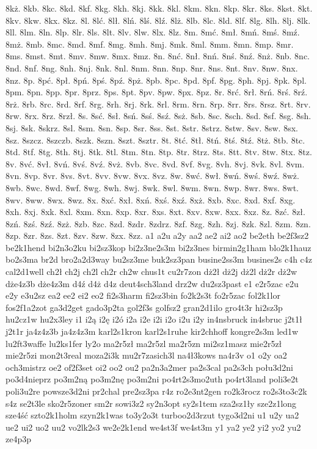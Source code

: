 {8kż.
8kb.
8kc.
8kd.
8kf.
8kg.
8kh.
8kj.
8kk.
8kl.
8km.
8kn.
8kp.
8kr.
8ks.
8kst.
8kt.
8kv.
8kw.
8kx.
8kz.
8l.
8lć.
8lł.
8lń.
8lś.
8lź.
8lż.
8lb.
8lc.
8ld.
8lf.
8lg.
8lh.
8lj.
8lk.
8ll.
8lm.
8ln.
8lp.
8lr.
8ls.
8lt.
8lv.
8lw.
8lx.
8lz.
8m.
8mć.
8mł.
8mń.
8mś.
8mź.
8mż.
8mb.
8mc.
8md.
8mf.
8mg.
8mh.
8mj.
8mk.
8ml.
8mm.
8mn.
8mp.
8mr.
8ms.
8mst.
8mt.
8mv.
8mw.
8mx.
8mz.
8n.
8nć.
8nł.
8nń.
8nś.
8nź.
8nż.
8nb.
8nc.
8nd.
8nf.
8ng.
8nh.
8nj.
8nk.
8nl.
8nm.
8nn.
8np.
8nr.
8ns.
8nt.
8nv.
8nw.
8nx.
8nz.
8p.
8pć.
8pł.
8pń.
8pś.
8pź.
8pż.
8pb.
8pc.
8pd.
8pf.
8pg.
8ph.
8pj.
8pk.
8pl.
8pm.
8pn.
8pp.
8pr.
8prz.
8ps.
8pt.
8pv.
8pw.
8px.
8pz.
8r.
8rć.
8rł.
8rń.
8rś.
8rź.
8rż.
8rb.
8rc.
8rd.
8rf.
8rg.
8rh.
8rj.
8rk.
8rl.
8rm.
8rn.
8rp.
8rr.
8rs.
8rsz.
8rt.
8rv.
8rw.
8rx.
8rz.
8rzł.
8s.
8sć.
8sł.
8sń.
8sś.
8sź.
8sż.
8sb.
8sc.
8sch.
8sd.
8sf.
8sg.
8sh.
8sj.
8sk.
8skrz.
8sl.
8sm.
8sn.
8sp.
8sr.
8ss.
8st.
8str.
8strz.
8stw.
8sv.
8sw.
8sx.
8sz.
8szcz.
8szczb.
8szk.
8szn.
8szt.
8sztr.
8t.
8tć.
8tł.
8tń.
8tś.
8tź.
8tż.
8tb.
8tc.
8td.
8tf.
8tg.
8th.
8tj.
8tk.
8tl.
8tm.
8tn.
8tp.
8tr.
8trz.
8ts.
8tt.
8tv.
8tw.
8tx.
8tz.
8v.
8vć.
8vł.
8vń.
8vś.
8vź.
8vż.
8vb.
8vc.
8vd.
8vf.
8vg.
8vh.
8vj.
8vk.
8vl.
8vm.
8vn.
8vp.
8vr.
8vs.
8vt.
8vv.
8vw.
8vx.
8vz.
8w.
8wć.
8wł.
8wń.
8wś.
8wź.
8wż.
8wb.
8wc.
8wd.
8wf.
8wg.
8wh.
8wj.
8wk.
8wl.
8wm.
8wn.
8wp.
8wr.
8ws.
8wt.
8wv.
8ww.
8wx.
8wz.
8x.
8xć.
8xł.
8xń.
8xś.
8xź.
8xż.
8xb.
8xc.
8xd.
8xf.
8xg.
8xh.
8xj.
8xk.
8xl.
8xm.
8xn.
8xp.
8xr.
8xs.
8xt.
8xv.
8xw.
8xx.
8xz.
8z.
8zć.
8zł.
8zń.
8zś.
8zź.
8zż.
8zb.
8zc.
8zd.
8zdr.
8zdrz.
8zf.
8zg.
8zh.
8zj.
8zk.
8zl.
8zm.
8zn.
8zp.
8zr.
8zs.
8zt.
8zv.
8zw.
8zx.
8zz.
a1
a2u
a2y
aa2
ae2
ai2
ao2
be2eth
be2f3sz2
be2k1hend
bi2n3o2ku
bi2sz3kop
bi2z3ne2s3m
bi2z3nes
birmin2g1ham
blo2k1hauz
bo2s3ma
br2d
bro2a2d3way
bu2sz3me
buk2sz3pan
busine2ss3m
busines2s
c4h
c4z
cal2d1well
ch2ł
ch2j
ch2l
ch2r
ch2w
chus1t
cu2r7zon
dż2ł
dż2j
dż2l
dż2r
dż2w
dże4z3b
dże4z3m
d4ź
d4ż
d4z
deut4sch3land
drz2w
du2sz3past
e1
e2r5zac
e2u
e2y
e3u2sz
ea2
ee2
ei2
eo2
fi2s3harm
fi2sz3bin
fo2k2s3t
fo2r5zac
fol2k1lor
fos2f1a2zot
ga3d2get
gado3p2ta
gol2f3s
golfsz2
gran2d1ilo
gro4t3r
hi2sz3p
hu2cz1w
hu2x3ley
i1
i2ą
i2ę
i2ó
i2a
i2e
i2i
i2o
i2u
i2y
in4nsbruck
in4sbruc
j2t1ł
j2t1r
ja4z4z3b
ja4z4z3m
karl2s1kron
karl2s1ruhe
kir2chhoff
kongre2s3m
led1w
lu2ft3waffe
lu2ks1fer
ly2o
ma2r5zł
ma2r5zl
ma2r5zn
mi2sz1masz
mie2r5zł
mie2r5zi
mon2t3real
moza2i3k
mu2r7zasich3l
na4ł3kows
na4r3v
o1
o2y
oa2
och3mistrz
oe2
of2f3set
oi2
oo2
ou2
pa2n3a2mer
pa2s3cal
pa2s3ch
połu3d2ni
po3d4nieprz
po3m2ną
po3m2nę
po3m2ni
po4rt2s3mo2uth
po4rt3land
poli3e2t
poli3u2re
powsze3d2ni
pr2chal
pre2sz3pa
r4z
ro2e3nt2gen
ro2k3rocz
ro2s3to3c2k
s4z
se2t3le
sko2r5zoner
sm2r
sowi3z2
sy2n3opt
sy2s1tem
sza2sz1ły
sze2z1long
sze4ść
szto2k1holm
szyn2k1was
to3y2o3t
turboo2d3rzut
tygo3d2ni
u1
u2y
ua2
ue2
ui2
uo2
uu2
vo2lk2s3
we2e2k1end
we4st3f
we4st3m
y1
ya2
ye2
yi2
yo2
yu2
ze4p3p
}
